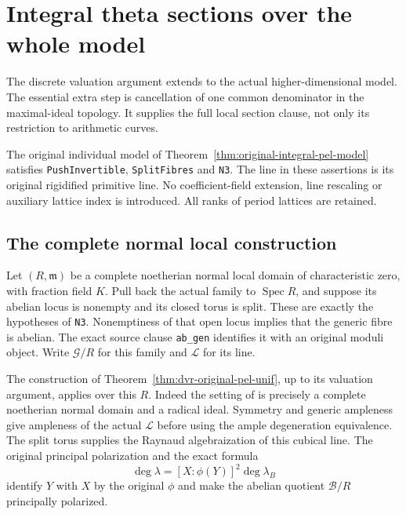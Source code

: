 \section{Integral theta sections over the whole model}
\label{sec:pel-integral-theta}

The discrete valuation argument extends to the actual higher-dimensional
model.  The essential extra step is cancellation of one common
denominator in the maximal-ideal topology.  It supplies the full local
section clause, not only its restriction to arithmetic curves.

\begin{theorem}
\label{thm:pel-integral-theta}
The original individual model of
Theorem~\ref{thm:original-integral-pel-model} satisfies
\texttt{PushInvertible}, \texttt{SplitFibres} and \texttt{N3}.
The line in these assertions is its original rigidified primitive line.
No coefficient-field extension, line rescaling or auxiliary lattice
index is introduced.  All ranks of period lattices are retained.
\end{theorem}

\subsection*{The complete normal local construction}

Let $(R,\mathfrak m)$ be a complete noetherian normal local domain of
characteristic zero, with fraction field $K$.  Pull back the actual
family to $\operatorname{Spec}R$, and suppose its abelian locus is
nonempty and its closed torus is split.  These are exactly the
hypotheses of \texttt{N3}.  Nonemptiness of that open locus implies
that the generic fibre is abelian.  The exact source clause
\texttt{ab\_gen} identifies it with an original moduli object.
Write $\mathcal G/R$ for this family and $\mathscr L$ for its line.

The construction of Theorem~\ref{thm:dvr-original-pel-unif}, up to
its valuation argument, applies over this $R$.  Indeed the setting of
\cite[Section 4.1]{integral-theta-lan} is precisely a complete
noetherian normal domain and a radical ideal.  Symmetry and generic
ampleness give ampleness of the actual $\mathscr L$ before using the
ample degeneration equivalence.  The split torus supplies the
Raynaud algebraization of this cubical line.  The original principal
polarization and the exact formula
\[
             \deg\lambda=[X:\phi(Y)]^2\deg\lambda_B
\]
identify $Y$ with $X$ by the original $\phi$ and make the abelian
quotient $\mathcal B/R$ principally polarized.

